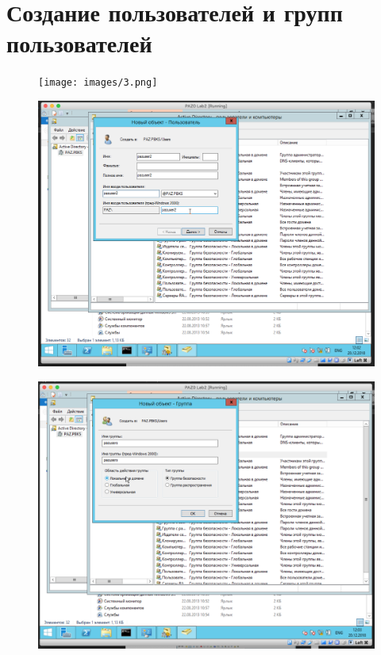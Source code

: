 \section{Создание пользователей и групп пользователей}

\begin{figure}[H]
	\centering
	\texttt{[image: images/3.png]}
\end{figure}

\begin{figure}[H]
	\centering
	\includegraphics[width=.8\textwidth]{images/4.png}
\end{figure}

\begin{figure}[H]
	\centering
	\includegraphics[width=.8\textwidth]{images/5.png}
\end{figure}

